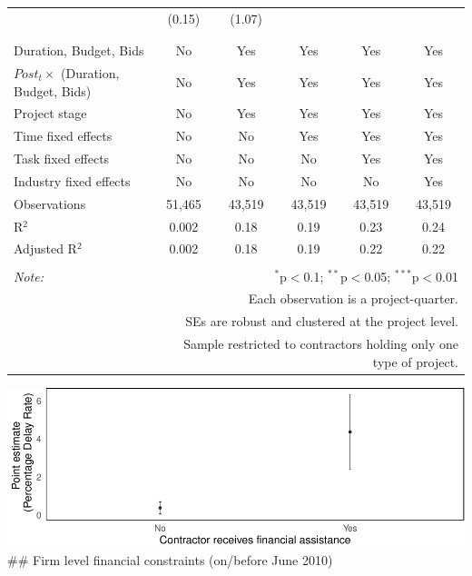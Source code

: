 \documentclass[
]{article}
\begin{document}
\begin{table}[H]
\begin{tabular}{@{\extracolsep{-2pt}}lccccc}
  & (0.15) & (1.07) &  &  &  \\ 
  & & & & & \\ 
\hline \\[-1.8ex] 
Duration, Budget, Bids & No & Yes & Yes & Yes & Yes \\ 
$Post_t \times $  (Duration, Budget, Bids) & No & Yes & Yes & Yes & Yes \\ 
Project stage & No & Yes & Yes & Yes & Yes \\ 
Time fixed effects & No & No & Yes & Yes & Yes \\ 
Task fixed effects & No & No & No & Yes & Yes \\ 
Industry fixed effects & No & No & No & No & Yes \\ 
Observations & 51,465 & 43,519 & 43,519 & 43,519 & 43,519 \\ 
R$^{2}$ & 0.002 & 0.18 & 0.19 & 0.23 & 0.24 \\ 
Adjusted R$^{2}$ & 0.002 & 0.18 & 0.19 & 0.22 & 0.22 \\ 
\hline 
\hline \\[-1.8ex] 
\textit{Note:}  & \multicolumn{5}{r}{$^{*}$p$<$0.1; $^{**}$p$<$0.05; $^{***}$p$<$0.01} \\ 
 & \multicolumn{5}{r}{Each observation is a project-quarter.} \\ 
 & \multicolumn{5}{r}{SEs are robust and clustered at the project level.} \\ 
 & \multicolumn{5}{r}{Sample restricted to contractors holding only one type of project.} \\ 
\end{tabular} 
\end{table}

\includegraphics{qp_first_pc_delay-2_files/figure-latex/financial_assistance_plot-1.pdf}
\#\# Firm level financial constraints (on/before June 2010)
\end{document}

